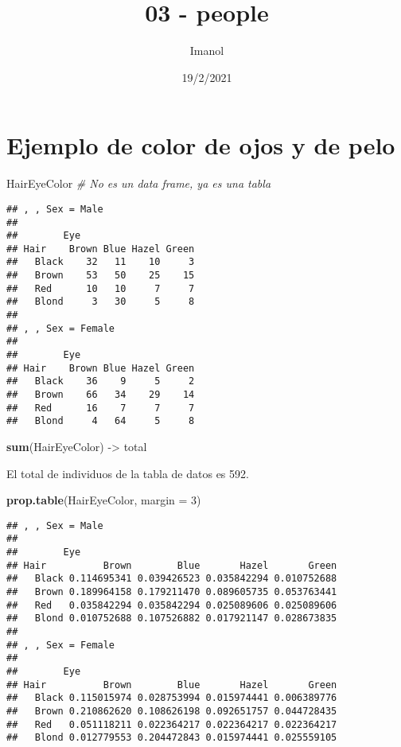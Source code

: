 \documentclass[
]{article}
\title{03 - people}
\author{Imanol}
\date{19/2/2021}
\newenvironment{Shaded}{\begin{snugshade}}{\end{snugshade}}
\newcommand{\CommentTok}[1]{\textcolor[rgb]{0.56,0.35,0.01}{\textit{#1}}}
\newcommand{\DataTypeTok}[1]{\textcolor[rgb]{0.13,0.29,0.53}{#1}}
\newcommand{\DecValTok}[1]{\textcolor[rgb]{0.00,0.00,0.81}{#1}}
\newcommand{\KeywordTok}[1]{\textcolor[rgb]{0.13,0.29,0.53}{\textbf{#1}}}
\newcommand{\NormalTok}[1]{#1}
\newcommand{\StringTok}[1]{\textcolor[rgb]{0.31,0.60,0.02}{#1}}
\begin{document}
\maketitle

\hypertarget{ejemplo-de-color-de-ojos-y-de-pelo}{%
\section{Ejemplo de color de ojos y de
pelo}\label{ejemplo-de-color-de-ojos-y-de-pelo}}

\begin{Shaded}
\begin{Highlighting}[]
\NormalTok{HairEyeColor }\CommentTok{# No es un data frame, ya es una tabla}
\end{Highlighting}
\end{Shaded}

\begin{verbatim}
## , , Sex = Male
## 
##        Eye
## Hair    Brown Blue Hazel Green
##   Black    32   11    10     3
##   Brown    53   50    25    15
##   Red      10   10     7     7
##   Blond     3   30     5     8
## 
## , , Sex = Female
## 
##        Eye
## Hair    Brown Blue Hazel Green
##   Black    36    9     5     2
##   Brown    66   34    29    14
##   Red      16    7     7     7
##   Blond     4   64     5     8
\end{verbatim}

\begin{Shaded}
\begin{Highlighting}[]
\KeywordTok{sum}\NormalTok{(HairEyeColor) ->}\StringTok{ }\NormalTok{total}
\end{Highlighting}
\end{Shaded}

El total de individuos de la tabla de datos es 592.

\begin{Shaded}
\begin{Highlighting}[]
\KeywordTok{prop.table}\NormalTok{(HairEyeColor, }\DataTypeTok{margin =} \DecValTok{3}\NormalTok{)}
\end{Highlighting}
\end{Shaded}

\begin{verbatim}
## , , Sex = Male
## 
##        Eye
## Hair          Brown        Blue       Hazel       Green
##   Black 0.114695341 0.039426523 0.035842294 0.010752688
##   Brown 0.189964158 0.179211470 0.089605735 0.053763441
##   Red   0.035842294 0.035842294 0.025089606 0.025089606
##   Blond 0.010752688 0.107526882 0.017921147 0.028673835
## 
## , , Sex = Female
## 
##        Eye
## Hair          Brown        Blue       Hazel       Green
##   Black 0.115015974 0.028753994 0.015974441 0.006389776
##   Brown 0.210862620 0.108626198 0.092651757 0.044728435
##   Red   0.051118211 0.022364217 0.022364217 0.022364217
##   Blond 0.012779553 0.204472843 0.015974441 0.025559105
\end{verbatim}
\end{document}
